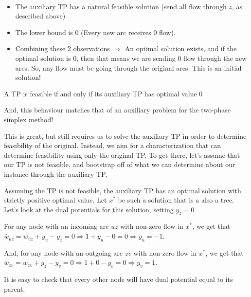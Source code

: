 \begin{remark}
    ~
    \begin{itemize}
        \item The auxiliary TP has a natural feasible solution (send all flow through $z$, as described above)
        \item The lower bound is $0$ (Every new arc receives $0$ flow).
        \item Combining these 2 observations $\Rightarrow$ An optimal solution exists, and if the optimal solution is $0$, then that means we are sending $0$ flow through the new arcs. So, any flow must be going through the original arcs. This is an initial solution!
    \end{itemize}
\end{remark}

\begin{theorem}{}{}
    A TP is feasible if and only if its auxiliary TP has optimal value $0$
\end{theorem}
And, this behaviour matches that of an auxiliary problem for the two-phase simplex method!

This is great, but still requires us to solve the auxiliary TP in order to determine feasibility of the original. 
Instead, we aim for a characterization that can determine feasibility using only the original TP.
To get there, let's assume that our TP is not feasible, and bootstrap off of what we can determine about our instance through the auxiliary TP.

Assuming the TP is not feasible, the auxiliary TP has an optimal solution with strictly positive optimal value. Let $x^*$ be such a solution that is a also a tree. Let's look at the dual potentials for this solution, setting $y_z = 0$

For any node with an incoming arc $uz$ with non-zero flow in $x^*$, we get that $\bar{w}_{uz} = w_{uz} + y_u - y_z = 0 \Rightarrow 1 + y_u - 0 = 0 \Rightarrow y_u = - 1$.

And, for any node with an outgoing arc $zv$ with non-zero flow in $x^*$, we get that $\bar{w}_{zv} = w_{zv} + y_z - y_v = 0 \Rightarrow 1 + 0 - y_v = 0 \Rightarrow y_v = 1$.

It is easy to check that every other node will have dual potential equal to its parent.

